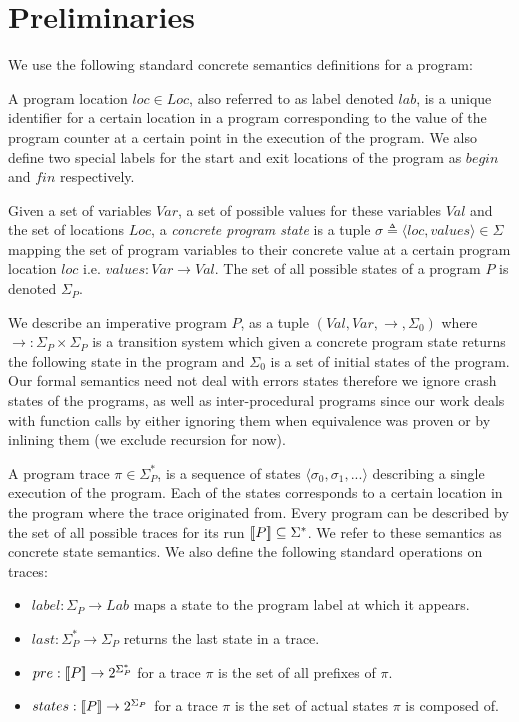 \section{Preliminaries} 
We use the following standard concrete semantics definitions for a program:

 
A program location $loc \in Loc$, also referred to as label denoted $lab$, is a unique identifier for a certain location in a program corresponding to the value of the program counter at a certain point in the execution of the program. We also define two special labels for the start and exit locations of the program as $begin$ and $fin$ respectively.

 
Given a set of variables $Var$, a set of possible values for these variables $Val$ and the set of locations $Loc$, a \emph{concrete program state} is a tuple $\sigma \triangleq \langle loc, values \rangle \in \Sigma$ mapping the set of program variables to their concrete value at a certain program location $loc$ i.e. $values : Var \rightarrow Val$. The set of all possible states of a program $P$ is denoted $\Sigma_{P}$.

\begin{sloppypar}
 
We describe an imperative program $P$, as a tuple $(Val,Var,\rightarrow,\Sigma_{0})$ where $\rightarrow : \Sigma_{P} \times \Sigma_{P} $  is a transition system which given a concrete program state returns the following state in the program and $\Sigma_{0}$ is a set of initial states of the program. Our formal semantics need not deal with errors states therefore we ignore crash states of the programs, as well as inter-procedural programs since our work deals with function calls by either ignoring them when equivalence was proven or by inlining them (we exclude recursion for now).
\end{sloppypar}

 
A program trace $\pi \in \Sigma^*_{P}$, is a sequence of states $\langle \sigma_0,\sigma_1,... \rangle$ describing a single execution of the program. Each of the states corresponds to a certain location in the program where the trace originated from. Every program can be described by the set of all possible traces for its run $\lbrack\!\lbrack P \rbrack\!\rbrack \subseteq \Sigma^*$. We refer to these semantics as concrete state semantics. We also define the following standard operations on traces:
\begin{itemize}
\item $label : \Sigma_{P} \rightarrow Lab$ maps a state to the program label at which it appears.
\item $last : \Sigma_{P}^* \rightarrow \Sigma_{P}$ returns the last state in a trace.
\item $pre : \lbrack\!\lbrack P \rbrack\!\rbrack \rightarrow 2^{\Sigma_{P}^*}$ for a trace $\pi$ is the set of all prefixes of $\pi$.
\item $states : \lbrack\!\lbrack P \rbrack\!\rbrack \rightarrow 2^{\Sigma_{P}}$ for a trace $\pi$ is the set of actual states $\pi$ is composed of.
\end{itemize}


